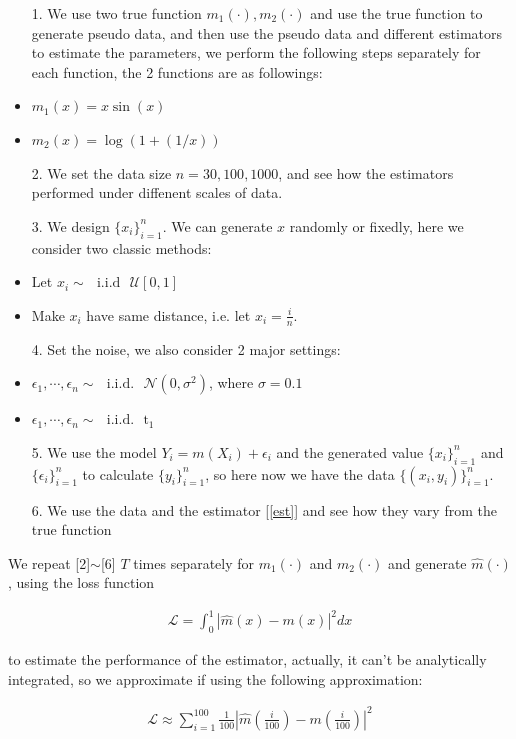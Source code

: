 \documentclass[twoside]{article}
\begin{document}
\begin{itemize}
  \item[1.] We use two true function $m_1(\cdot),m_2(\cdot)$ and use the true function to generate pseudo data, and then use the pseudo data and different estimators to estimate the parameters, we perform the following steps separately for each function, the 2 functions are as followings:
        \item $m_1(x)=x\sin(x)$
        \item $m_2(x)=\log(1+(1/x))$
  \item[2.] We set the data size $n=30, 100, 1000$, and see how the estimators performed under diffenent scales of data.
  \item[3.] We design $\{x_i\}_{i=1}^n$. We can generate $x$ randomly or fixedly, here we consider two classic methods:
        \item Let $x_i \sim\text{ }\mathrm{i.i.d}\textbf{ }\mathcal{U}[0, 1]$
        \item Make $x_i$ have same distance, i.e. let $x_i = \frac{i}{n}$.
  \item[4.] Set the noise, we also consider 2 major settings:
        \item $\epsilon_1, \cdots, \epsilon_n \sim\text{ }\mathrm{i.i.d.} \text{ }\mathcal{N}(0,\sigma^2)$, where $\sigma=0.1$
        \item $\epsilon_1, \cdots, \epsilon_n \sim\text{ }\mathrm{i.i.d.} \text{ }\mathrm{t}_1$
  \item[5.] We use the model $Y_i=m(X_i) + \epsilon_i$ and the generated value $\{x_i\}_{i=1}^n$ and $\{\epsilon_i\}_{i=1}^n$ to calculate $\{y_i\}_{i=1}^n$, so here now we have the data $\{(x_i,y_i)\}_{i=1}^n$.
  \item[6.] We use the data and the estimator [\ref{est}] and see how they vary from the true function
\end{itemize}

We repeat [2]$\sim$[6] $T$ times separately for $m_1(\cdot)$ and $m_2(\cdot)$ and generate $\hat{m}(\cdot)$, using the loss function

\begin{eqnarray}
  \mathcal{L} = \int_{0}^{1}{|\hat{m}(x)-m(x)|^2 dx}
\end{eqnarray}

to estimate the performance of the estimator, actually, it can't be analytically integrated, so we approximate if using the following approximation:

\begin{eqnarray}
\label{lossf}
  \mathcal{L} \approx \sum_{i=1}^{100}{\frac{1}{100}|\hat{m}(\frac{i}{100})-m(\frac{i}{100})|^2}
\end{eqnarray}
\end{document}
